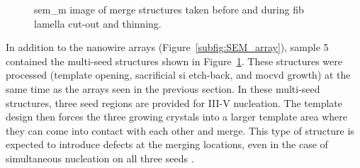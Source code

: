 \begin{figure}
    \centering
    \caption{\acs{sem_m} image of merge structures taken  before and  during \acs{fib} lamella cut-out and thinning.}
    \label{fig:SEM_merge}
\end{figure}

In addition to the nanowire arrays (Figure~\ref{subfig:SEM_array}), sample 5 contained the multi-seed structures shown in Figure~\ref{fig:SEM_merge}. These structures were processed (template opening, sacrificial \acl{si} etch-back, and \acs{mocvd} growth) at the same time as the arrays seen in the previous section. In these multi-seed structures, three seed regions are provided for III-V nucleation. The template design then forces the three growing crystals into a larger template area where they can come into contact with each other and merge. This type of structure is expected to introduce defects at the merging locations, even in the case of simultaneous nucleation on all three seeds \cite{Mauthe2021}.

